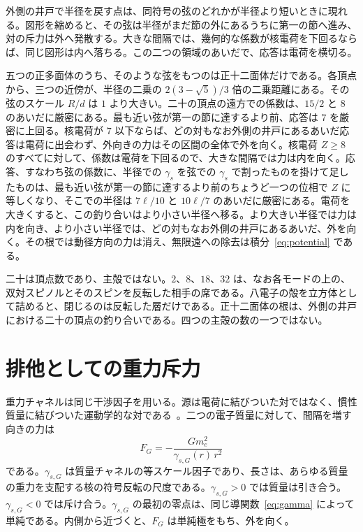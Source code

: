 \documentclass[a4paper]{article}
\begin{document}
外側の井戸で半径を戻す点は、同符号の弦のどれかが半径より短いときに現れる。図形を縮めると、その弦は半径がまだ節の外にあるうちに第一の節へ進み、対の斥力は外へ発散する。大きな間隔では、幾何的な係数が核電荷を下回るならば、同じ図形は内へ落ちる。この二つの領域のあいだで、応答は電荷を横切る。

五つの正多面体のうち、そのような弦をもつのは正十二面体だけである。各頂点から、三つの近傍が、半径の二乗の \(2(3-\sqrt{5})/3\) 倍の二乗距離にある。その弦のスケール \(R/d\) は \(1\) より大きい。二十の頂点の遠方での係数は、\(15/2\) と \(8\) のあいだに厳密にある。最も近い弦が第一の節に達するより前、応答は \(7\) を厳密に上回る。核電荷が \(7\) 以下ならば、どの対もなお外側の井戸にあるあいだ応答は電荷に出会わず、外向きの力はその区間の全体で外を向く。核電荷 \(Z\ge 8\) のすべてに対して、係数は電荷を下回るので、大きな間隔では力は内を向く。応答、すなわち弦の係数に、半径での \(\gamma_s\) を弦での \(\gamma_s\) で割ったものを掛けて足したものは、最も近い弦が第一の節に達するより前のちょうど一つの位相で \(Z\) に等しくなり、そこでの半径は \(7\ell/10\) と \(10\ell/7\) のあいだに厳密にある。電荷を大きくすると、この釣り合いはより小さい半径へ移る。より大きい半径では力は内を向き、より小さい半径では、どの対もなお外側の井戸にあるあいだ、外を向く。その根では動径方向の力は消え、無限遠への除去は積分~\eqref{eq:potential} である。

二十は頂点数であり、主殻ではない。\(2\)、\(8\)、\(18\)、\(32\) は、なお各モードの上の、双対スピノルとそのスピンを反転した相手の席である。八電子の殻を立方体として詰めると、閉じるのは反転した層だけである。正十二面体の根は、外側の井戸における二十の頂点の釣り合いである。四つの主殻の数の一つではない。

\section{排他としての重力斥力}
\label{sec:pauli}

重力チャネルは同じ干渉因子を用いる。源は電荷に結びついた対ではなく、慣性質量に結びついた運動学的な対である~\cite{dst-main}。二つの電子質量に対して、間隔を増す向きの力は
\begin{equation}
\label{eq:grav}
F_G=-\frac{G m_e^{2}}{\gamma_{s,G}(r)\,r^{2}}
\end{equation}
である。\(\gamma_{s,G}\) は質量チャネルの等スケール因子であり、長さは、あらゆる質量の重力を支配する核の符号反転の尺度である。\(\gamma_{s,G}>0\) では質量は引き合う。\(\gamma_{s,G}<0\) では斥け合う。\(\gamma_{s,G}\) の最初の零点は、同じ導関数~\eqref{eq:gamma} によって単純である。内側から近づくと、\(F_G\) は単純極をもち、外を向く。
\end{document}
